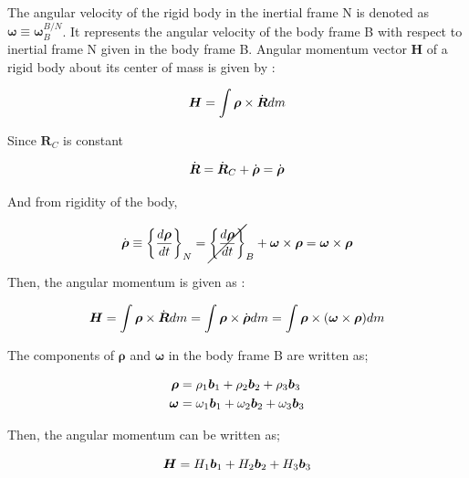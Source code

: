 The angular velocity of the rigid body in the inertial frame N is denoted as $\bm{\omega} \equiv \bm{\omega}_B^{B/N}$. 
It represents the angular velocity of the body frame B with respect to inertial frame N given in the body frame B. 
Angular momentum vector $\bm{H}$ of a rigid body about its center of mass is given by :

\begin{equation}{\label{eqn:kinematicEquDQM}}
\bm{H} = \int \bm{\rho} \times \dot{\bm{R}} dm
\end{equation}

Since $\bm{R}_C$ is constant

\begin{equation}{\label{eqn:kinematicEquDQM}}
\dot{\bm{R}} = \dot{\bm{R}}_C + \dot{\bm{\rho}} = \dot{\bm{\rho}}
\end{equation}

And from rigidity of the body,

\begin{equation}{\label{eqn:kinematicEquDQM}}
\dot{\bm{\rho}} \equiv \bigg\{ \frac{d\bm{\rho}}{dt} \bigg\}_N = {\cancel{\bigg\{ \frac{d\bm{\rho}}{dt} \bigg\}}}_B + \bm{\omega} \times \bm{\rho} = \bm{\omega} \times \bm{\rho}
\end{equation}

Then, the angular momentum is given as :

\begin{equation}{\label{eqn:kinematicEquDQM}}
\bm{H} = \int \bm{\rho} \times \dot{\bm{R}} dm = \int \bm{\rho} \times \dot{\bm{\rho}} dm = \int \bm{\rho} \times  (\bm{\omega} \times \bm{\rho} )dm
\end{equation}

The components of $\bm{\rho}$ and $\bm{\omega}$ in the body frame B are written as;

\begin{align}{\label{eqn:omega_and_rho}}
\begin{split}
\bm{\rho} & = \rho_1 \bm{b}_1 + \rho_2 \bm{b}_2 + \rho_3 \bm{b}_3 \\
\bm{\omega} & = \omega_1 \bm{b}_1 + \omega_2 \bm{b}_2 + \omega_3 \bm{b}_3 \\
\end{split}
\end{align}

Then, the angular momentum can be written as;

\begin{equation}{\label{eqn:angMomentumComp}}
\bm{H} = H_1 \bm{b}_1 + H_2 \bm{b}_2 + H_3 \bm{b}_3 
\end{equation}

